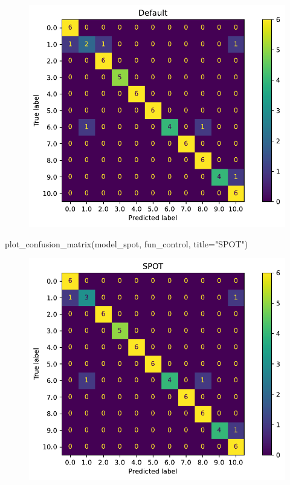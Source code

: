 \documentclass[
  letterpaper,
  DIV=11,
  numbers=noendperiod]{scrreprt}
\newenvironment{Shaded}{\begin{snugshade}}{\end{snugshade}}
\newcommand{\NormalTok}[1]{\textcolor[rgb]{0.00,0.23,0.31}{#1}}
\newcommand{\OperatorTok}[1]{\textcolor[rgb]{0.37,0.37,0.37}{#1}}
\newcommand{\StringTok}[1]{\textcolor[rgb]{0.13,0.47,0.30}{#1}}
\begin{document}
\begin{figure}[H]

{\centering \includegraphics{16_spot_hpt_sklearn_multiclass_classification_randomforest_files/figure-pdf/cell-42-output-1.pdf}

}

\end{figure}

\begin{Shaded}
\begin{Highlighting}[]
\NormalTok{plot\_confusion\_matrix(model\_spot, fun\_control, title}\OperatorTok{=}\StringTok{"SPOT"}\NormalTok{)}
\end{Highlighting}
\end{Shaded}

\begin{figure}[H]

{\centering \includegraphics{16_spot_hpt_sklearn_multiclass_classification_randomforest_files/figure-pdf/cell-43-output-1.pdf}

}

\end{figure}
\end{document}
